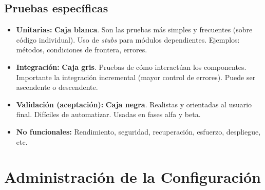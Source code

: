 \subsection{Pruebas específicas}\label{subsec:pruebas-especificas}

\begin{itemize}
    \item \textbf{Unitarias:} \textbf{Caja blanca}.
    Son las pruebas más simples y frecuentes (sobre código individual).
    Uso de \emph{stubs} para módulos dependientes.
    Ejemplos: métodos, condiciones de frontera, errores.
    \item \textbf{Integración:} \textbf{Caja gris}.
    Pruebas de cómo interactúan los componentes.
    Importante la integración incremental (mayor control de errores).
    Puede ser ascendente o descendente.
    \item \textbf{Validación (aceptación):} \textbf{Caja negra}.
    Realistas y orientadas al usuario final.
    Difíciles de automatizar.
    Usadas en fases alfa y beta.
    \item \textbf{No funcionales:} Rendimiento, seguridad, recuperación, esfuerzo, despliegue, etc.
\end{itemize}


\section{Administración de la Configuración}\label{sec:administracion-de-la-configuracion}


